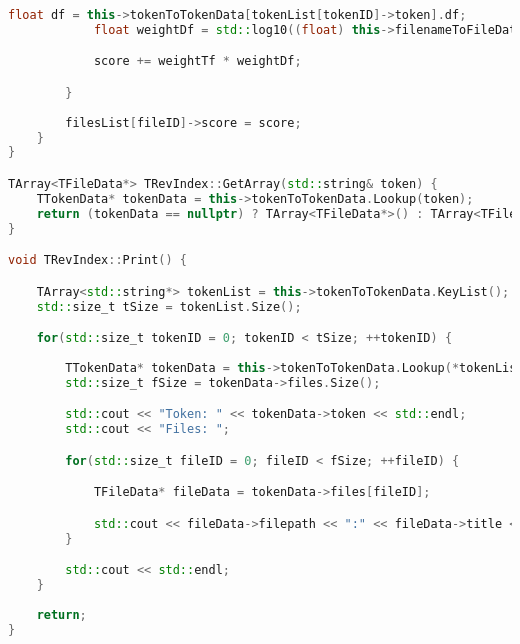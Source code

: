 \begin{lstlisting}[language=C++]
            float df = this->tokenToTokenData[tokenList[tokenID]->token].df;
            float weightDf = std::log10((float) this->filenameToFileData.Size() / df);

            score += weightTf * weightDf;

        }
        
        filesList[fileID]->score = score;
    }
}

TArray<TFileData*> TRevIndex::GetArray(std::string& token) {
    TTokenData* tokenData = this->tokenToTokenData.Lookup(token);
    return (tokenData == nullptr) ? TArray<TFileData*>() : TArray<TFileData*>(tokenData->files);
}

void TRevIndex::Print() {

    TArray<std::string*> tokenList = this->tokenToTokenData.KeyList();
    std::size_t tSize = tokenList.Size();

    for(std::size_t tokenID = 0; tokenID < tSize; ++tokenID) {
        
        TTokenData* tokenData = this->tokenToTokenData.Lookup(*tokenList[tokenID]);
        std::size_t fSize = tokenData->files.Size();

        std::cout << "Token: " << tokenData->token << std::endl;
        std::cout << "Files: ";

        for(std::size_t fileID = 0; fileID < fSize; ++fileID) {

            TFileData* fileData = tokenData->files[fileID];

            std::cout << fileData->filepath << ":" << fileData->title << " | ";
        }

        std::cout << std::endl;
    }
    
    return;
}
\end{lstlisting}

